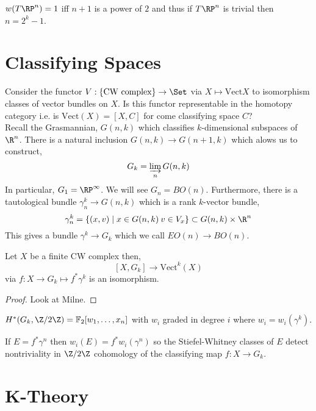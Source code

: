\documentclass[12pt]{extarticle}
\begin{document}
\begin{cor}
$w(T \RP^n) = 1$ iff $n + 1$ is a power of $2$ and thus if $ T \RP^n$ is trivial then $n = 2^k - 1$. 
\end{cor}

\section{Classifying Spaces}

\newcommand{\Vect}{\mathrm{Vect}}

Consider the functor $V : \{ \text{CW complex} \} \to \Set$ via $X \mapsto \Vect{X}$ to isomorphism classes of vector bundles on $X$. Is this functor representable in the homotopy category i.e. is $\Vect(X) = [X, C]$ for come classifying space $C$?
\bigskip\\
Recall the Grasmannian, $G(n, k)$ which classifies $k$-dimensional subspaces of $\R^n$. There is a natural inclusion $G(n, k) \to G(n+1, k)$ which alows us to construct,
\[ G_k = \varinjlim_{n} G(n, k) \]
In particular, $G_1 = \RP^\infty$. We will see $G_n = BO(n)$. Furthermore, there is a tautological bundle $\gamma^k_n \to G(n, k)$ which is a rank $k$-vector bundle,
\[ \gamma^k_n = \{ (x, v) \mid x \in G(n, k) \: v \in V_x \} \subset G(n, k) \times \R^{n} \]
This gives a bundle $\gamma^k \to G_k$ which we call $EO(n) \to BO(n)$. 

\begin{theorem}
Let $X$ be a finite CW complex then,
\[ [X, G_k] \to \Vect^k(X) \] 
via $f : X \to G_k \mapsto f^* \gamma^k$ is an isomorphism. 
\end{theorem}

\begin{proof}
Look at Milne.
\end{proof}

\begin{theorem}
$H^*(G_k, \Z / 2 \Z) = \mathbb{F}_2[w_1, \dots, x_n]$ 
with $w_i$ graded in degree $i$ where $w_i = w_i(\gamma^k)$.
\end{theorem}

\begin{cor}
If $E = f^* \gamma^n$ then $w_i(E) = f^* w_i(\gamma^n)$ so the Stiefel-Whitney classes of $E$ detect nontriviality in $\Z / 2 \Z$ cohomology of the classifying map $f : X \to G_k$. 
\end{cor}

\section{K-Theory}
\end{document}

